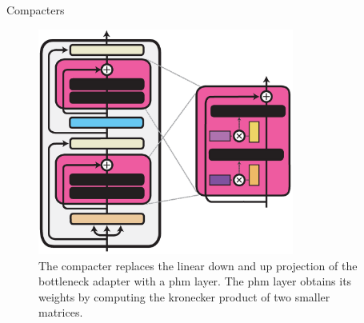 \documentclass[serif, aspectratio=169]{beamer}
\begin{document}
\begin{frame}{Compacters}
    \begin{figure}
        \centering
        \includegraphics[width=0.75\textwidth, height=0.65\textheight]{pic/compacter.png}
        \caption{The compacter replaces the linear down and up projection of the bottleneck adapter with a phm layer. The phm layer obtains its weights by computing the kronecker product of two smaller matrices.}
    \end{figure}
\end{frame}
\end{document}
